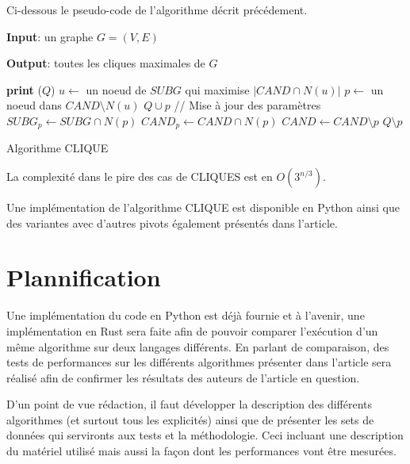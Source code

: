 \documentclass[12pt,a4paper]{article}
\begin{document}
Ci-dessous le pseudo-code de l'algorithme décrit précédement.
\begin{algorithm}[H]
  \textbf{Input}: un graphe $G = (V,E)$

  \textbf{Output}: toutes les cliques maximales de $G$
  \begin{algorithmic}[1]
       
        \State \textbf{print} ($ Q $)
      \Else
        \State $u \gets$ un noeud de $SUBG$ qui maximise $|CAND \cap N(u)|$
          \State $p \gets$ un noeud dans $CAND \setminus N(u)$
          \State $ Q \cup p $ 
          \State // Mise à jour des paramètres
          \State $SUBG_p \gets SUBG \cap N(p)$
          \State $CAND_p \gets CAND \cap N(p)$
          \State {}
          \State $CAND \gets CAND \setminus {p}$
          \State $ Q \setminus p $ 
        \EndWhile
      \EndIf
    \EndProcedure
    \State {}
  \end{algorithmic}
  \caption{\label{fig:cliques} Algorithme CLIQUE}
\end{algorithm}

La complexité dans le pire des cas de CLIQUES est en $ O(3^{n/3}) $\cite{CONTE20221}.

Une implémentation de l'algorithme CLIQUE est disponible en Python ainsi que des variantes avec d'autres pivots également présentés dans l'article.

\section{Plannification}%
\label{sec:plan}

Une implémentation du code en Python est déjà fournie et à l'avenir, une implémentation en Rust sera faite afin de pouvoir comparer l'exécution d'un même algorithme sur deux langages différents. En parlant de comparaison, des tests de performances sur les différents algorithmes présenter dans l'article sera réalisé afin de confirmer les résultats des auteurs de l'article en question.

D'un point de vue rédaction, il faut développer la description des différents algorithmes (et surtout tous les explicités) ainsi que de présenter les sets de données qui servironts aux tests et la méthodologie. Ceci incluant une description du matériel utilisé mais aussi la façon dont les performances vont être mesurées.
\end{document}
